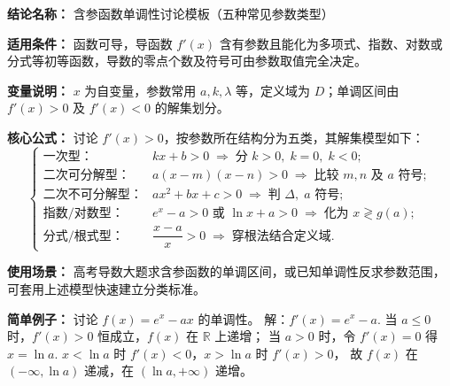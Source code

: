 \textbf{结论名称：} 含参函数单调性讨论模板（五种常见参数类型）

\textbf{适用条件：} 函数可导，导函数 \(f'(x)\) 含有参数且能化为多项式、指数、对数或分式等初等函数，导数的零点个数及符号可由参数取值完全决定。

\textbf{变量说明：} \(x\) 为自变量，参数常用 \(a,k,\lambda\) 等，定义域为 \(D\)；单调区间由 \(f'(x)>0\) 及 \(f'(x)<0\) 的解集划分。

\textbf{核心公式：} 讨论 \(f'(x)>0\)，按参数所在结构分为五类，其解集模型如下：
\[
\boxed{
\begin{cases}
\text{一次型：} & kx+b>0 \;\Rightarrow\; \text{分 } k>0,\;k=0,\;k<0; \\[4pt]
\text{二次可分解型：} & a(x-m)(x-n)>0 \;\Rightarrow\; \text{比较 } m,n \text{ 及 } a \text{ 符号}; \\[4pt]
\text{二次不可分解型：} & ax^2+bx+c>0 \;\Rightarrow\; \text{判 } \Delta,\;a \text{ 符号}; \\[4pt]
\text{指数/对数型：} & e^x-a>0 \text{ 或 } \ln x+a>0 \;\Rightarrow\; \text{化为 } x \gtrless g(a); \\[4pt]
\text{分式/根式型：} & \dfrac{x-a}{x}>0 \;\Rightarrow\; \text{穿根法结合定义域}.
\end{cases}
}
\]

\textbf{使用场景：} 高考导数大题求含参函数的单调区间，或已知单调性反求参数范围，可套用上述模型快速建立分类标准。

\textbf{简单例子：} 讨论 \(f(x)=e^x-ax\) 的单调性。  
解：\(f'(x)=e^x-a\).  
当 \(a\le 0\) 时，\(f'(x)>0\) 恒成立，\(f(x)\) 在 \(\mathbb{R}\) 上递增；  
当 \(a>0\) 时，令 \(f'(x)=0\) 得 \(x=\ln a\).  
\(x<\ln a\) 时 \(f'(x)<0\)，\(x>\ln a\) 时 \(f'(x)>0\)，  
故 \(f(x)\) 在 \((-\infty,\ln a)\) 递减，在 \((\ln a,+\infty)\) 递增。